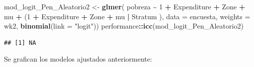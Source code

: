 \documentclass[
  12pt,
]{book}
\newenvironment{Shaded}{\begin{snugshade}}{\end{snugshade}}
\newcommand{\AttributeTok}[1]{\textcolor[rgb]{0.13,0.29,0.53}{#1}}
\newcommand{\DecValTok}[1]{\textcolor[rgb]{0.00,0.00,0.81}{#1}}
\newcommand{\FunctionTok}[1]{\textcolor[rgb]{0.13,0.29,0.53}{\textbf{#1}}}
\newcommand{\NormalTok}[1]{#1}
\newcommand{\OtherTok}[1]{\textcolor[rgb]{0.56,0.35,0.01}{#1}}
\newcommand{\SpecialCharTok}[1]{\textcolor[rgb]{0.81,0.36,0.00}{\textbf{#1}}}
\newcommand{\StringTok}[1]{\textcolor[rgb]{0.31,0.60,0.02}{#1}}
\begin{document}
\begin{Shaded}
\begin{Highlighting}[]
\NormalTok{mod\_logit\_Pen\_Aleatorio2 }\OtherTok{\textless{}{-}} \FunctionTok{glmer}\NormalTok{(}
\NormalTok{  pobreza }\SpecialCharTok{\textasciitilde{}} \DecValTok{1} \SpecialCharTok{+}\NormalTok{ Expenditure }\SpecialCharTok{+}\NormalTok{ Zone }\SpecialCharTok{+}\NormalTok{ mu }\SpecialCharTok{+}
\NormalTok{    (}\DecValTok{1} \SpecialCharTok{+}\NormalTok{ Expenditure }\SpecialCharTok{+}\NormalTok{ Zone }\SpecialCharTok{+}\NormalTok{ mu }\SpecialCharTok{|}\NormalTok{ Stratum ),}
    \AttributeTok{data =}\NormalTok{ encuesta, }\AttributeTok{weights  =}\NormalTok{  wk2, }
  \FunctionTok{binomial}\NormalTok{(}\AttributeTok{link =} \StringTok{"logit"}\NormalTok{))}
\NormalTok{performance}\SpecialCharTok{::}\FunctionTok{icc}\NormalTok{(mod\_logit\_Pen\_Aleatorio2)}
\end{Highlighting}
\end{Shaded}

\begin{verbatim}
## [1] NA
\end{verbatim}

Se grafican los modelos ajustados anteriormente:
\end{document}
